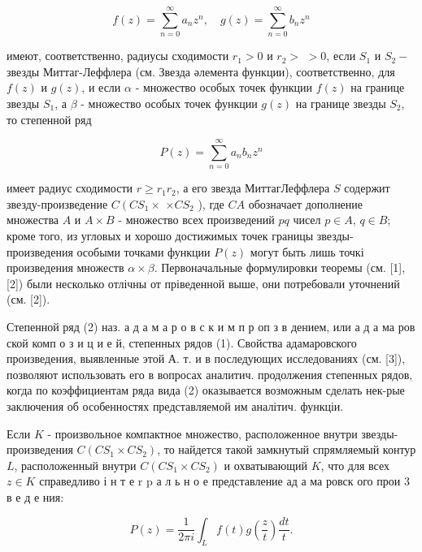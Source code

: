 \documentclass[10pt]{article}
\begin{document}
\[

f(z)=\sum_{n=0}^{\infty} a_{n} z^{n}, \quad g(z)=\sum_{n=0}^{\infty} b_{n} z^{n}

\]



имеют, соответственно, радиусы сходимости $r_{1}>0$ и $r_{2}>$ $>0$, если $S_{1}$ и $S_{2}-$ звезды Миттаг-Леффлера (см. Звезда әлемента функции), соответственно, для $f(z)$ и $g(z)$, и если $\alpha$ - множество особых точек функции $f(z)$ на границе звезды $S_{1}$, а $\beta$ - множество особых точек функции $g(z)$ на границе звезды $S_{2}$, то степенной ряд



\[

P(z)=\sum_{n=0}^{\infty} a_{n} b_{n} z^{n}

\]



имеет радиус сходимости $r \geqslant r_{1} r_{2}$, а его звезда МиттагЛеффлера $S$ содержит звезду-произведение $C\left(C S_{1} \times\right.$ $\times C S_{2}$ ), где $C A$ обозначает дополнение множества $A$ и $A \times B$ - множество всех произведений $p q$ чисел $p \in A$, $q \in B$; кроме того, из угловых и хорошо достижимых точек границы звезды-произведения особыми точками функции $P(z)$ могут быть лишь точкі произведения множеств $\alpha \times \beta$. Первоначальные формулировки теоремы (см. [1], [2]) были несколько отлічны от пріведенной выше, они потребовали уточнений (см. [2]).



Степенной ряд (2) наз. а д а м а р о в с к и м п р оп з в дением, или а д а ма ров ской комп о з и ц и е й, степенных рядов (1). Свойства адамаровского произведения, выявленные этой А. т. и в последующих исследованиях (см. [3]), позволяют использовать его в вопросах аналитич. продолжения степенных рядов, когда по коэффициентам ряда вида (2) оказывается возможным сделать нек-рые заключения об особенностях представляемой им аналітич. функціи.



Если $K$ - произвольное компактное множество, расположенное внутри звезды-произведения $C\left(C S_{1} \times C S_{2}\right)$, то найдется такой замкнутый спрямляемый контур $L$, расположенный внутри $C\left(C S_{1} \times C S_{2}\right)$ и охватывающий $K$, что для всех $z \in K$ справедливо і н т е r p а л ь н о е представление ад а ма ровск ого прои 3 в е д е ния:



\[

P(z)=\frac{1}{2 \pi i} \int_{L} f(t) g\left(\frac{z}{t}\right) \frac{d t}{t} .

\]
\end{document}
